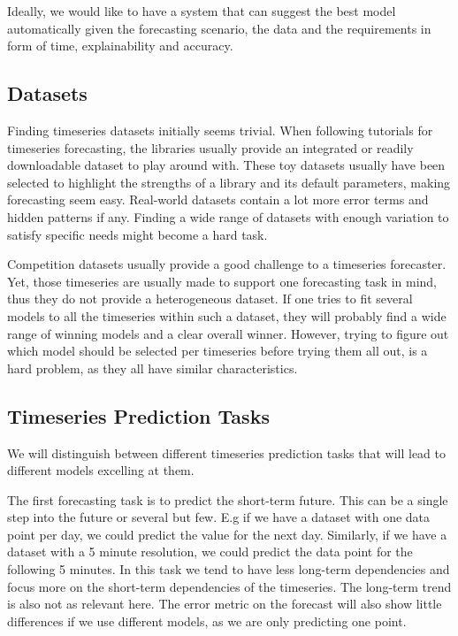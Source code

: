 Ideally, we would like to have a system that can suggest the best model automatically given the forecasting scenario, the data and the requirements in form of time, explainability and accuracy.

\subsection{Datasets}

Finding timeseries datasets initially seems trivial. When following tutorials for timeseries forecasting, the libraries usually provide an integrated or readily downloadable dataset to play around with. These toy datasets usually have been selected to highlight the strengths of a library and its default parameters, making forecasting seem easy. Real-world datasets contain a lot more error terms and hidden patterns if any. Finding a wide range of datasets with enough variation to satisfy specific needs might become a hard task.

Competition datasets usually provide a good challenge to a timeseries forecaster. Yet, those timeseries are usually made to support one forecasting task in mind, thus they do not provide a heterogeneous dataset. If one tries to fit several models to all the timeseries within such a dataset, they will probably find a wide range of winning models and a clear overall winner. However, trying to figure out which model should be selected per timeseries before trying them all out, is a hard problem, as they all have similar characteristics.


\subsection{Timeseries Prediction Tasks}

We will distinguish between different timeseries prediction tasks that will lead to different models excelling at them.

The first forecasting task is to predict the short-term future. This can be a single step into the future or several but few. E.g if we have a dataset with one data point per day, we could predict the value for the next day. Similarly, if we have a dataset with a 5 minute resolution, we could predict the data point for the following 5 minutes. In this task we tend to have less long-term dependencies and focus more on the short-term dependencies of the timeseries. The long-term trend is also not as relevant here. The error metric on the forecast will also show little differences if we use different models, as we are only predicting one point.

